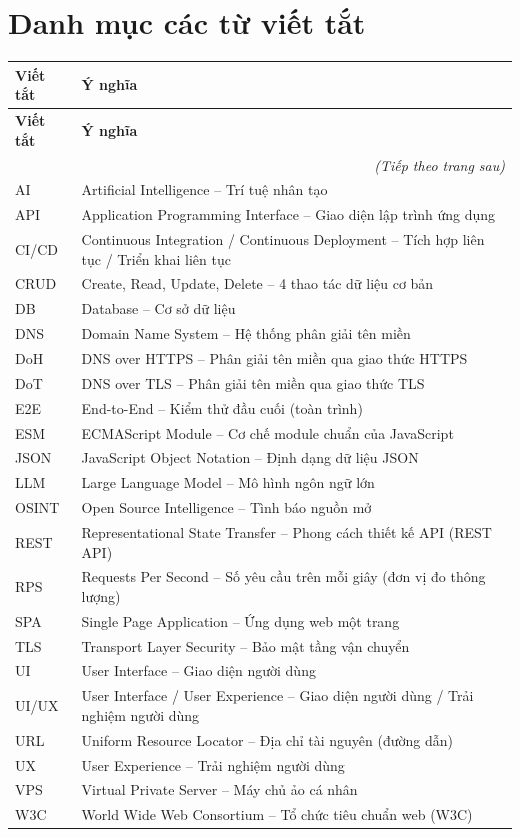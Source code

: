 \chapter*{Danh mục các từ viết tắt}
\begin{longtable}{@{}p{}p{}@{}}
\toprule
\textbf{Viết tắt} & \textbf{Ý nghĩa} \\
\midrule
\endfirsthead
\toprule
\textbf{Viết tắt} & \textbf{Ý nghĩa} \\
\midrule
\endhead
\midrule
\multicolumn{2}{r}{\textit{(Tiếp theo trang sau)}}\\
\endfoot
\bottomrule
\endlastfoot

AI    & Artificial Intelligence -- Trí tuệ nhân tạo \\
API   & Application Programming Interface -- Giao diện lập trình ứng dụng \\
CI/CD & Continuous Integration / Continuous Deployment -- Tích hợp liên tục / Triển khai liên tục \\
CRUD  & Create, Read, Update, Delete -- 4 thao tác dữ liệu cơ bản \\
DB    & Database -- Cơ sở dữ liệu \\
DNS   & Domain Name System -- Hệ thống phân giải tên miền \\
DoH   & DNS over HTTPS -- Phân giải tên miền qua giao thức HTTPS \\
DoT   & DNS over TLS -- Phân giải tên miền qua giao thức TLS \\
E2E   & End-to-End -- Kiểm thử đầu cuối (toàn trình) \\
ESM   & ECMAScript Module -- Cơ chế module chuẩn của JavaScript \\
JSON  & JavaScript Object Notation -- Định dạng dữ liệu JSON \\
LLM   & Large Language Model -- Mô hình ngôn ngữ lớn \\
OSINT & Open Source Intelligence -- Tình báo nguồn mở \\
REST  & Representational State Transfer -- Phong cách thiết kế API (REST API) \\
RPS   & Requests Per Second -- Số yêu cầu trên mỗi giây (đơn vị đo thông lượng) \\
SPA   & Single Page Application -- Ứng dụng web một trang \\
TLS   & Transport Layer Security -- Bảo mật tầng vận chuyển \\
UI    & User Interface -- Giao diện người dùng \\
UI/UX & User Interface / User Experience -- Giao diện người dùng / Trải nghiệm người dùng \\
URL   & Uniform Resource Locator -- Địa chỉ tài nguyên (đường dẫn) \\
UX    & User Experience -- Trải nghiệm người dùng \\
VPS   & Virtual Private Server -- Máy chủ ảo cá nhân \\
W3C   & World Wide Web Consortium -- Tổ chức tiêu chuẩn web (W3C) \\
\end{longtable}
